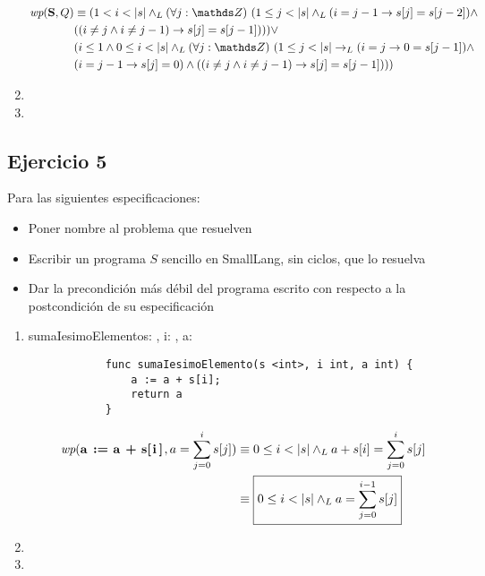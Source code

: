 \begin{enumerate}[label=\alph*)]
          \begin{align*}
              \wp{S}{Q} & \equiv (1 < i < |s| \yLuego \paraTodo{j}{\ent}{1 \leq j < |s| \yLuego (i = j - 1 \Then s[j] = s[j-2]) \land        \\
                        & ((i \neq j \land i \neq j - 1) \Then s[j] = s[j-1])})\lor                                                          \\
                        & (i \leq 1 \land 0 \leq i < |s| \yLuego \paraTodo{j}{\ent}{1 \leq j < |s| \thenLuego (i = j \Then 0 = s[j-1]) \land \\
                        & (i = j-1 \Then s[j] = 0) \land ((i \neq j \land i \neq j-1) \Then s[j] = s[j-1])})
          \end{align*}

    \item \hacer
    \item \hacer
\end{enumerate}

\subsection{Ejercicio 5}
Para las siguientes especificaciones:

\begin{itemize}
    \item Poner nombre al problema que resuelven
    \item Escribir un programa $S$ sencillo en SmallLang, sin ciclos, que lo resuelva
    \item Dar la precondición más débil del programa escrito con respecto a la postcondición de su especificación
\end{itemize}

\begin{enumerate}[label=\alph*)]
    \item \begin{proc}{sumaIesimoElemento}{\In s: \TLista{\ent}, \In i: \ent, \Inout a: \ent}{}
          \end{proc}

          \begin{lstlisting}
            func sumaIesimoElemento(s <int>, i int, a int) {
                a := a + s[i];
                return a
            }
          \end{lstlisting}

          \begin{align*}
              \wp{a := a + s[i]}{a = \sum_{j=0}^{i} s[j]} & \equiv 0 \leq i < |s| \yLuego a + s[i] = \sum_{j=0}^{i} s[j]    \\
                                                          & \equiv \boxed{0 \leq i < |s| \yLuego a = \sum_{j=0}^{i-1} s[j]}
          \end{align*}

    \item \hacer
    \item \hacer
\end{enumerate}

